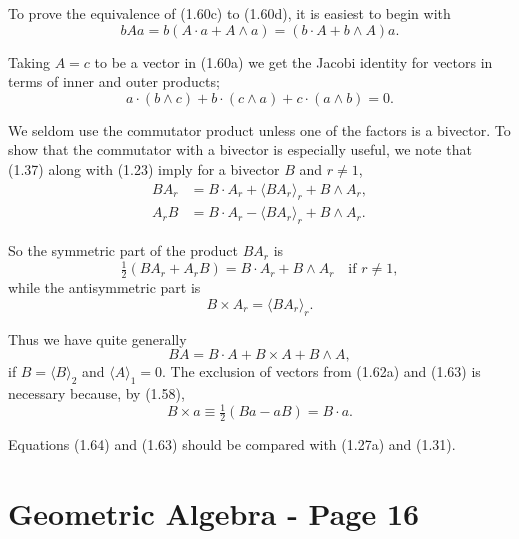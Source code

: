 \documentclass[fleqn]{scrartcl}
\numberwithin{equation}{section}
\begin{document}
\noindent To prove the equivalence of (1.60c) to (1.60d), it is easiest to begin with
\[
bAa = b(A \cdot a + A \wedge a) = (b \cdot A + b \wedge A)a.
\]

\vspace{1em}
\noindent Taking \(A = c\) to be a vector in (1.60a) we get the Jacobi identity for vectors in terms of inner and outer products;
\begin{equation}
a \cdot (b \wedge c) + b \cdot (c \wedge a) + c \cdot (a \wedge b) = 0. \tag{1.61}
\end{equation}

\vspace{1em}
\noindent We seldom use the commutator product unless one of the factors is a bivector. To show that the commutator with a bivector is especially useful, we note that (1.37) along with (1.23) imply for a bivector \(B\) and \(r \neq 1\),
\begin{align*}
BA_r &= B \cdot A_r + \langle BA_r \rangle_r + B \wedge A_r, \\
A_rB &= B \cdot A_r - \langle BA_r \rangle_r + B \wedge A_r.
\end{align*}

\noindent So the symmetric part of the product \(BA_r\) is
\begin{equation}
\tfrac{1}{2}(BA_r + A_rB) = B \cdot A_r + B \wedge A_r \quad \text{if } r \neq 1, \tag{1.62a}
\end{equation}
while the antisymmetric part is
\begin{equation}
B \times A_r = \langle BA_r \rangle_r. \tag{1.62b}
\end{equation}

\noindent Thus we have quite generally
\begin{equation}
BA = B \cdot A + B \times A + B \wedge A, \tag{1.63}
\end{equation}
if \(B = \langle B \rangle_2\) and \(\langle A \rangle_1 = 0\). The exclusion of vectors from (1.62a) and (1.63) is necessary because, by (1.58),
\begin{equation}
B \times a \equiv \tfrac{1}{2}(Ba - aB) = B \cdot a. \tag{1.64}
\end{equation}

\noindent Equations (1.64) and (1.63) should be compared with (1.27a) and (1.31).


\section*{Geometric Algebra - Page 16}
\end{document}
